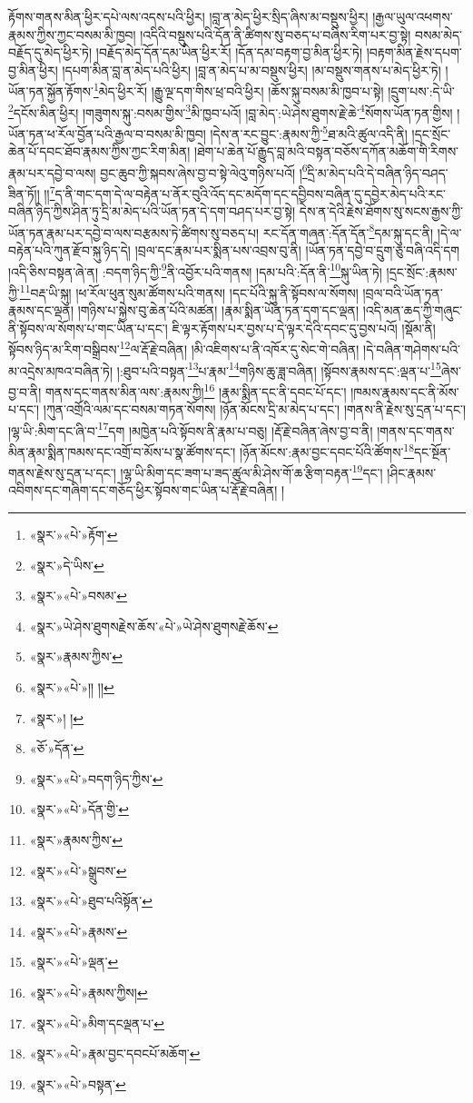 རྟོགས་གནས་མིན་ཕྱིར་དཔེ་ལས་འདས་པའི་ཕྱིར། །བླ་ན་མེད་ཕྱིར་སྲིད་ཞིས་མ་བསྡུས་ཕྱིར། །རྒྱལ་ཡུལ་འཕགས་རྣམས་ཀྱིས་ཀྱང་བསམ་མི་ཁྱབ། །འདིའི་བསྡུས་པའི་དོན་ནི་ཚིགས་སུ་བཅད་པ་བཞིས་རིག་པར་བྱ་སྟེ། བསམ་མེད་བརྗོད་དུ་མེད་ཕྱིར་ཏེ། །བརྗོད་མེད་དོན་དམ་ཡིན་ཕྱིར་རོ། །དོན་དམ་བརྟག་བྱ་མིན་ཕྱིར་ཏེ། །བརྟག་མིན་རྗེས་དཔག་བྱ་མིན་ཕྱིར། །དཔག་མིན་བླ་ན་མེད་པའི་ཕྱིར། །བླ་ན་མེད་པ་མ་བསྡུས་ཕྱིར། །མ་བསྡུས་གནས་པ་མེད་ཕྱིར་ཏེ། །ཡོན་ཏན་སྐྱོན་རྟོགས་\footnote{«སྣར་»«པེ་»རྟོག་}མེད་ཕྱིར་རོ། །རྒྱུ་ལྔ་དག་གིས་ཕྲ་བའི་ཕྱིར། །ཆོས་སྐུ་བསམ་མི་ཁྱབ་པ་སྟེ། །དྲུག་པས་:དེ་ཡི་\footnote{«སྣར་»དེ་ཡིས་}དངོས་མིན་ཕྱིར། །གཟུགས་སྐུ་:བསམ་གྱིས་\footnote{«སྣར་»«པེ་»བསམ་}མི་ཁྱབ་པའོ། །བླ་མེད་:ཡེ་ཤེས་ཐུགས་རྗེ་ཆེ་\footnote{«སྣར་»ཡེ་ཤེས་ཐུགསརྗེས་ཆོས་«པེ་»ཡེ་ཤེས་ཐུགསརྗེ་ཆོས་}སོགས་ཡོན་ཏན་གྱིས། །ཡོན་ཏན་ཕ་རོལ་བྱོན་པའི་རྒྱལ་བ་བསམ་མི་ཁྱབ། །དེས་ན་རང་བྱུང་:རྣམས་ཀྱི་\footnote{«སྣར་»རྣམས་ཀྱིས་}ཐ་མའི་ཚུལ་འདི་ནི། །དྲང་སྲོང་ཆེན་པོ་དབང་ཐོབ་རྣམས་ཀྱིས་ཀྱང་རིག་མིན། །ཐེག་པ་ཆེན་པོ་རྒྱུད་བླ་མའི་བསྟན་བཅོས་དཀོན་མཆོག་གི་རིགས་རྣམ་པར་དབྱེ་བ་ལས། བྱང་ཆུབ་ཀྱི་སྐབས་ཞེས་བྱ་བ་སྟེ་ལེའུ་གཉིས་པའོ། །\footnote{«སྣར་»«པེ་»།། །།}དྲི་མ་མེད་པའི་དེ་བཞིན་ཉིད་བཤད་ཟིན་ཏོ།། །།\footnote{«སྣར་»། །}ད་ནི་གང་དག་དེ་ལ་བརྟེན་པ་ནོར་བུའི་འོད་དང་མདོག་དང་དབྱིབས་བཞིན་དུ་དབྱེར་མེད་པའི་རང་བཞིན་ཉིད་ཀྱིས་ཤིན་ཏུ་དྲི་མ་མེད་པའི་ཡོན་ཏན་དེ་དག་བཤད་པར་བྱ་སྟེ། དེས་ན་དེའི་རྗེས་ཐོགས་སུ་སངས་རྒྱས་ཀྱི་ཡོན་ཏན་རྣམ་པར་དབྱེ་བ་ལས་བརྩམས་ཏེ་ཚིགས་སུ་བཅད་པ། རང་དོན་གཞན་:དོན་དོན་\footnote{«ཅོ་»དོན་}དམ་སྐུ་དང་ནི། །དེ་ལ་བརྟེན་པའི་ཀུན་རྫོབ་སྐུ་ཉིད་དེ། །བྲལ་དང་རྣམ་པར་སྨིན་པས་འབྲས་བུ་ནི། །ཡོན་ཏན་དབྱེ་བ་དྲུག་ཅུ་བཞི་འདི་དག །འདི་ཅིས་བསྟན་ཞེ་ན། :བདག་ཉིད་ཀྱི་\footnote{«སྣར་»«པེ་»བདག་ཉིད་ཀྱིས་}ནི་འབྱོར་པའི་གནས། །དམ་པའི་:དོན་ནི་\footnote{«སྣར་»«པེ་»དོན་གྱི་}སྐུ་ཡིན་ཏེ། །དྲང་སྲོང་:རྣམས་ཀྱི་\footnote{«སྣར་»རྣམས་ཀྱིས་}བརྡ་ཡི་སྐུ། །ཕ་རོལ་ཕུན་སུམ་ཚོགས་པའི་གནས། །དང་པོའི་སྐུ་ནི་སྟོབས་ལ་སོགས། །བྲལ་བའི་ཡོན་ཏན་རྣམས་དང་ལྡན། །གཉིས་པ་སྐྱེས་བུ་ཆེན་པོའི་མཚན། །རྣམ་སྨིན་ཡོན་ཏན་དག་དང་ལྡན། །འདི་མན་ཆད་ཀྱི་གཞུང་ནི་སྟོབས་ལ་སོགས་པ་གང་ཡིན་པ་དང་། ཇི་ལྟར་རྟོགས་པར་བྱས་པ་དེ་ལྟར་དེའི་དབང་དུ་བྱས་པའོ། །སྡོམ་ནི། སྟོབས་ཉིད་མ་རིག་བསྒྲིབས་\footnote{«སྣར་»«པེ་»སྒྲུབས་}ལ་རྡོ་རྗེ་བཞིན། །མི་འཇིགས་པ་ནི་འཁོར་དུ་སེང་གེ་བཞིན། །དེ་བཞིན་གཤེགས་པའི་མ་འདྲེས་མཁའ་བཞིན་ཏེ། །:ཐུབ་པའི་བསྟན་\footnote{«སྣར་»«པེ་»ཐུབ་པའིསྟོན་}པ་རྣམ་\footnote{«སྣར་»«པེ་»རྣམས་}གཉིས་ཆུ་ཟླ་བཞིན། །སྟོབས་རྣམས་དང་:ལྡན་པ་\footnote{«སྣར་»«པེ་»ལྡན་}ཞེས་བྱ་བ་ནི། གནས་དང་གནས་མིན་ལས་:རྣམས་ཀྱི།\footnote{«སྣར་»«པེ་»རྣམས་ཀྱིས།} །རྣམ་སྨིན་དང་ནི་དབང་པོ་དང་། །ཁམས་རྣམས་དང་ནི་མོས་པ་དང་། །ཀུན་འགྲོའི་ལམ་དང་བསམ་གཏན་སོགས། །ཉོན་མོངས་དྲི་མ་མེད་པ་དང་། །གནས་ནི་རྗེས་སུ་དྲན་པ་དང་། །ལྷ་ཡི་:མིག་དང་ཞི་བ་\footnote{«སྣར་»«པེ་»མིག་དངལྡན་པ་}དག །མཁྱེན་པའི་སྟོབས་ནི་རྣམ་པ་བཅུ། །རྡོ་རྗེ་བཞིན་ཞེས་བྱ་བ་ནི། །གནས་དང་གནས་མིན་རྣམ་སྨིན་ཁམས་དང་འགྲོ་བ་མོས་པ་སྣ་ཚོགས་དང་། །ཉོན་མོངས་:རྣམ་བྱང་དབང་པོའི་ཚོགས་\footnote{«སྣར་»«པེ་»རྣམ་བྱང་དབངཔོ་མཆོག་}དང་སྔོན་གནས་རྗེས་སུ་དྲན་པ་དང་། །ལྷ་ཡི་མིག་དང་ཟག་པ་ཟད་ཚུལ་མི་ཤེས་གོ་ཆ་རྩིག་བརྟན་\footnote{«སྣར་»«པེ་»བསྟན་}དང་། །ཤིང་རྣམས་འབིགས་དང་གཞིག་དང་གཅོད་ཕྱིར་སྟོབས་གང་ཡིན་པ་རྡོ་རྗེ་བཞིན། །
